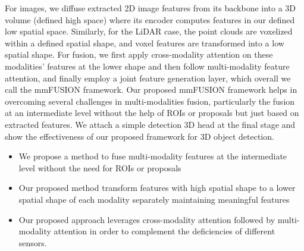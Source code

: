\documentclass[10pt,twocolumn,letterpaper]{article}
\begin{document}
For images, we diffuse extracted 2D image features from its backbone into a 3D volume (defined high space) where its encoder computes features in our defined low spatial space. Similarly, for the LiDAR case, the point clouds are voxelized within a defined spatial shape, and voxel features are transformed into a low spatial shape. For fusion, we first apply cross-modality attention on these modalities' features at the lower shape and then follow multi-modality feature attention, and finally employ a joint feature generation layer, which overall we call the mmFUSION framework. Our proposed mmFUSION framework helps in overcoming several challenges in multi-modalities fusion, particularly the fusion at an intermediate level without the help of ROIs or proposals but just based on extracted features. We attach a simple detection 3D head at the final stage and show the effectiveness of our proposed framework for 3D object detection.

\begin{itemize}
    \item We propose a method to fuse multi-modality features at the intermediate level without the need for ROIs or proposals
    \item Our proposed method transform features with high spatial shape to a lower spatial shape of each modality separately maintaining meaningful features
    \item Our proposed approach leverages cross-modality attention followed by multi-modality attention in order to complement the deficiencies of different sensors.
\end{itemize}

\end{document}
